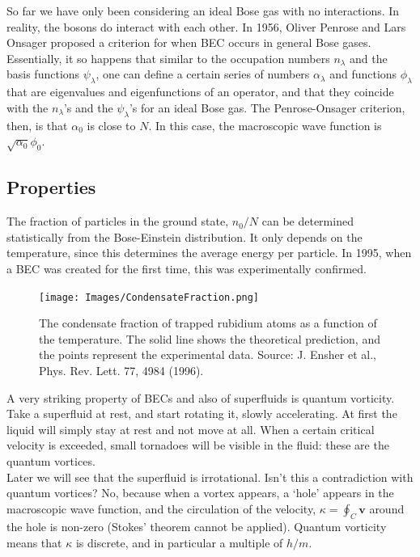 \documentclass{article}
\begin{document}
So far we have only been considering an ideal Bose gas with no interactions.  In reality, the bosons do interact with each other.  In 1956, Oliver Penrose and Lars Onsager proposed a criterion for when BEC occurs in general Bose gases.  Essentially, it so happens that similar to the occupation numbers $n_\lambda$ and the basis functions $\psi_\lambda$, one can define a certain series of numbers $\alpha_\lambda$ and functions $\phi_\lambda$ that are eigenvalues and eigenfunctions of an operator, and that they coincide with the $n_\lambda$'s and the $\psi_\lambda$'s for an ideal Bose gas.  The Penrose-Onsager criterion, then, is that $\alpha_0$ is close to $N$.  In this case, the macroscopic wave function is $\sqrt{\alpha_0} \phi_0$. 

\subsection{Properties}

The fraction of particles in the ground state, $n_0/N$ can be determined statistically from the Bose-Einstein distribution.  It only depends on the temperature, since this determines the average energy per particle.  In 1995, when a BEC was created for the first time, this was experimentally confirmed.

\begin{figure}[H]
    \centering
    \texttt{[image: Images/CondensateFraction.png]}
    \caption{The condensate fraction of trapped rubidium atoms as a function of the temperature.  The solid line shows the theoretical prediction, and the points represent the experimental data. Source: J. Ensher et al., Phys. Rev. Lett. 77, 4984 (1996).}
    \label{fig:enter-label}
\end{figure}

A very striking property of BECs and also of superfluids is quantum vorticity.  Take a superfluid at rest, and start rotating it, slowly accelerating.  At first the liquid will simply stay at rest and not move at all. When a certain critical velocity is exceeded, small tornadoes will be visible in the fluid: these are the quantum vortices.
\\

Later we will see that the superfluid is irrotational.  Isn't this a contradiction with quantum vortices? No, because when a vortex appears, a `hole' appears in the macroscopic wave function, and the circulation of the velocity, $\kappa = \oint_C{\mathbf{v}}$ around the hole is non-zero (Stokes' theorem cannot be applied).  Quantum vorticity means that $\kappa$ is discrete, and in particular a multiple of $h/m$.
\end{document}
